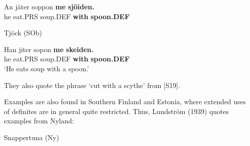

 \ea\label{}
\gll An  jäter  soppon  \textbf{me}\textbf{  sjöiden.}\\


he  eat.PRS  soup.DEF  \textbf{with} \textbf{spoon.DEF}\\

\item 

Tjöck (SOb)



 \ea\label{}
\gll Han  jiter  sopon  \textbf{me} \textbf{skeiden.}\\


he  eat.PRS  soup.DEF  \textbf{with} \textbf{spoon.DEF}\\

\glt ‘He eats soup with a spoon.’

\z

They also quote the phrase  ‘cut with a scythe’ from [S19]. 


Examples are also found in Southern Finland and Estonia, where extended uses of definites are in general quite restricted. Thus, Lundström (1939) quotes examples from Nyland:


\item 

Snappertuna (Ny) 



